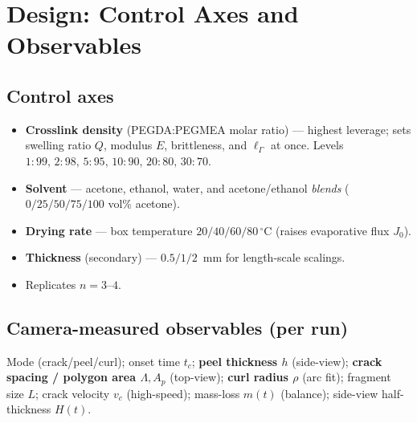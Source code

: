 \documentclass[12pt,letterpaper]{article}
\newcommand{\Gfrac}{\Gamma}
\newcommand{\Emod}{E}
\newcommand{\lG}{\ell_{\Gfrac}}          %
\newcommand{\Jflux}{J_0}
\begin{document}
\section{Design: Control Axes and Observables}
\subsection{Control axes}
\begin{itemize}[leftmargin=1.4em,itemsep=1pt]
\item \textbf{Crosslink density} (PEGDA:PEGMEA molar ratio) --- highest leverage;
sets swelling ratio $Q$, modulus $\Emod$, brittleness, and $\lG$ at once. Levels
$1{:}99,\,2{:}98,\,5{:}95,\,10{:}90,\,20{:}80,\,30{:}70$.
\item \textbf{Solvent} --- acetone, ethanol, water, and acetone/ethanol
\emph{blends} ($0/25/50/75/100$ vol\% acetone).
\item \textbf{Drying rate} --- box temperature $20/40/60/80\,^\circ$C (raises
evaporative flux $\Jflux$).
\item \textbf{Thickness} (secondary) --- $0.5/1/2$~mm for length-scale scalings.
\item Replicates $n=3$--$4$.
\end{itemize}

\subsection{Camera-measured observables (per run)}
Mode (crack/peel/curl); onset time $t_c$; \textbf{peel thickness $h$} (side-view);
\textbf{crack spacing / polygon area $\Lambda,A_p$} (top-view); \textbf{curl
radius $\rho$} (arc fit); fragment size $L$; crack velocity $v_c$ (high-speed);
mass-loss $m(t)$ (balance); side-view half-thickness $H(t)$.

\end{document}
